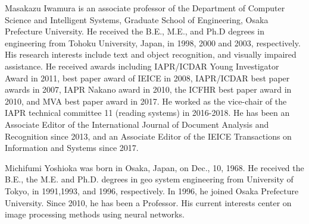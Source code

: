 \documentclass[journal]{IEEEtran}
\begin{document}
\begin{IEEEbiography}
{Masakazu Iwamura} is an associate professor of the Department of Computer Science and Intelligent Systems, Graduate School of Engineering, Osaka Prefecture University. He received the B.E., M.E., and Ph.D degrees in engineering from Tohoku University, Japan, in 1998, 2000 and 2003, respectively. His research interests include text and object recognition, and visually impaired assistance. He received awards including IAPR/ICDAR Young Investigator Award in 2011, best paper award of IEICE in 2008, IAPR/ICDAR best paper awards in 2007, IAPR Nakano award in 2010, the ICFHR best paper award in 2010, and MVA best paper award in 2017. He worked as the vice-chair of the IAPR technical committee 11 (reading systems) in 2016-2018. He has been an Associate Editor of the International Journal of Document Analysis and Recognition since 2013, and an Associate Editor of the IEICE Transactions on Information and Systems since 2017.
\end{IEEEbiography}

\begin{IEEEbiography}
{Michifumi Yoshioka}
was born in Osaka, Japan, on Dec., 10, 1968. He received the B.E., the M.E. and Ph.D. 
degrees in geo system engineering from University of Tokyo, in 1991,1993, and 1996, respectively. 
In 1996, he joined Osaka Prefecture University. Since 2010, he has been a Professor. 
His current interests center on image processing methods using neural networks.
\end{IEEEbiography}



\vfill
\end{document}
